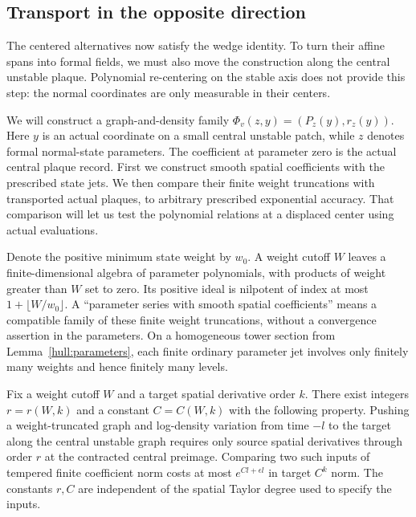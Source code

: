 \subsection{Transport in the opposite direction}

The centered alternatives now satisfy the wedge identity. To turn their
affine spans into formal fields, we must also move the construction along
the central unstable plaque. Polynomial re-centering on the stable axis
does not provide this step: the normal coordinates are only measurable
in their centers.

We will construct a graph-and-density family
$\Phi_v(z,y)=(P_z(y),r_z(y))$. Here $y$ is an actual coordinate on a
small central unstable patch, while $z$ denotes formal normal-state
parameters. The coefficient at parameter zero is the actual central
plaque record. First we construct smooth spatial coefficients with the
prescribed state jets. We then compare their finite weight truncations
with transported actual plaques, to arbitrary prescribed exponential
accuracy. That comparison will let us test the polynomial relations at
a displaced center using actual evaluations.

Denote the positive minimum state weight by $w_0$. A weight cutoff $W$
leaves a finite-dimensional algebra of parameter polynomials, with
products of weight greater than $W$ set to zero. Its positive ideal is
nilpotent of index at most $1+\lfloor W/w_0\rfloor$. A ``parameter
series with smooth spatial coefficients'' means a compatible family of
these finite weight truncations, without a convergence assertion in the
parameters. On a homogeneous tower section from
Lemma~\ref{hull:parameters}, each finite ordinary parameter jet involves
only finitely many weights and hence finitely many levels.

\begin{lemma}\label{hull:calculus}
Fix a weight cutoff $W$ and a target spatial derivative order $k$.
There exist integers $r=r(W,k)$ and a constant $C=C(W,k)$ with the
following property. Pushing a weight-truncated graph and log-density
variation from time $-l$ to the target along the central unstable graph
requires only source spatial derivatives through order $r$ at the
contracted central preimage. Comparing two such inputs of tempered
finite coefficient norm costs at most $e^{Cl+\epsilon l}$ in target
$C^k$ norm. The constants $r,C$ are independent of the spatial Taylor
degree used to specify the inputs.
\end{lemma}

